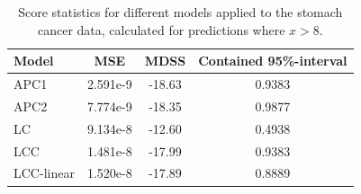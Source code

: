 \begin{table}[h!]
    \begin{center}
        \begin{tabular}{l |c c c }
            Model & MSE &   MDSS & Contained 95\%-interval\\
            \hline
            APC1    & 2.591e-9 & -18.63    & 0.9383 \\
            APC2    & 7.774e-9 & -18.35    & 0.9877 \\
            LC         & 9.134e-8 & -12.60    & 0.4938 \\
            LCC        & 1.481e-8 & -17.99    & 0.9383 \\ 
            LCC-linear & 1.520e-8 & -17.89    & 0.8889 \\
        \end{tabular}
        \caption{Score statistics for different models applied to the stomach cancer data, calculated for predictions where $x > 8$.}\label{tbl:uv-stomach-8}
    \end{center}
\end{table}